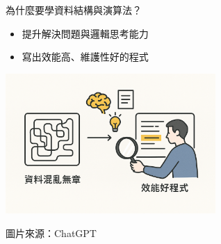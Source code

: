 \documentclass{beamer}
\begin{document}




\begin{frame}{為什麼要學資料結構與演算法？}
\begin{itemize}
    \item 提升解決問題與邏輯思考能力
    \item 寫出效能高、維護性好的程式
\end{itemize}

\vspace{1em}
\begin{center}
    \includegraphics[width=0.6\textwidth]{images/why.png}
    
    {\tiny 圖片來源：ChatGPT}
\end{center}
\end{frame}
\end{document}
